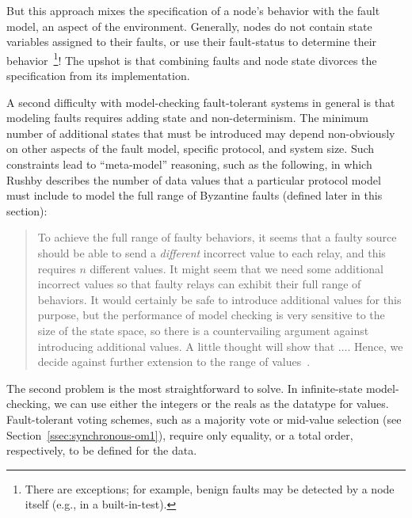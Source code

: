 \noindent
But this approach mixes the specification of a node's behavior with
the fault model, an aspect of the environment. Generally, nodes do
not contain state variables assigned to their faults, or use their
fault-status to determine their behavior~\footnote{There are
exceptions; for example, benign faults may be detected by a node
itself (e.g., in a built-in-test).}! The upshot is that combining
faults and node state divorces the specification from its implementation.

A second difficulty with model-checking fault-tolerant systems in
general is that modeling faults requires adding state and
non-determinism. The minimum number of additional states that must
be introduced may depend non-obviously on other aspects of the fault
model, specific protocol, and system size. Such constraints lead
to ``meta-model'' reasoning, such as the following, in which Rushby
describes the number of data values that a particular protocol model
must include to model the full range of Byzantine faults (defined
later in this section):

\begin{quote} To achieve the full range of faulty behaviors, it
seems that a faulty source should be able to send a \emph{different}
incorrect value to each relay, and this requires $n$ different
values. It might seem that we need some additional incorrect values
so that faulty relays can exhibit their full range of behaviors.
It would certainly be safe to introduce additional values for this
purpose, but the performance of model checking is very sensitive
to the size of the state space, so there is a countervailing argument
against introducing additional values. A little thought will show
that $\ldots$. Hence, we decide against further extension to the
range of values~\cite{Rushby-OM1}. \end{quote}

The second problem is the most straightforward to solve. In
infinite-state model-checking, we can use either the integers or
the reals as the datatype for values. Fault-tolerant voting schemes,
such as a majority vote or mid-value selection (see Section~\ref{ssec:synchronous-om1}),
require only equality, or a total order, respectively, to be defined
for the data.

